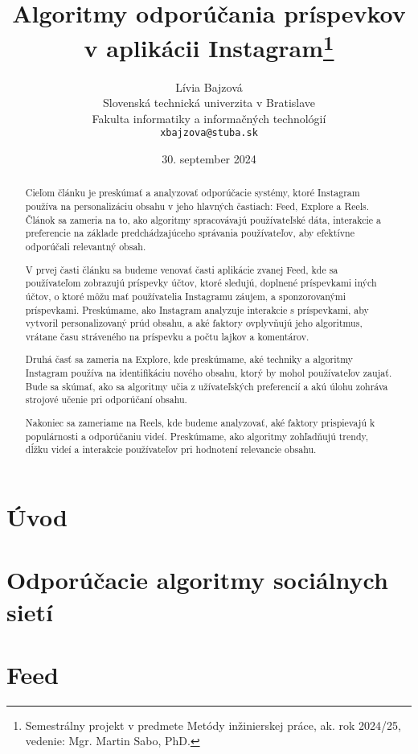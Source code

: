 \documentclass[10pt,twoside,slovak,a4paper]{article}
\title{Algoritmy odporúčania príspevkov v aplikácii Instagram\thanks{Semestrálny projekt v predmete Metódy inžinierskej práce, ak. rok 2024/25, vedenie: Mgr. Martin Sabo, PhD.}} %
\author{Lívia Bajzová\\[2pt]
	{\small Slovenská technická univerzita v Bratislave}\\
	{\small Fakulta informatiky a informačných technológií}\\
	{\small \texttt{xbajzova@stuba.sk}}
	}
\date{\small 30. september 2024} %
\begin{document}
\maketitle

\begin{abstract}
Cieľom článku je preskúmať a analyzovať odporúčacie systémy, ktoré Instagram používa na personalizáciu obsahu v jeho hlavných častiach: Feed, Explore a Reels. Článok sa zameria na to, ako algoritmy spracovávajú používateľské dáta, interakcie a preferencie na základe predchádzajúceho správania používateľov, aby efektívne odporúčali relevantný obsah.

V prvej časti článku sa budeme venovať časti aplikácie zvanej Feed, kde sa používateľom zobrazujú príspevky účtov, ktoré sledujú, doplnené príspevkami iných účtov, o ktoré môžu mať používatelia Instagramu záujem, a sponzorovanými príspevkami. Preskúmame, ako Instagram analyzuje interakcie s príspevkami, aby vytvoril personalizovaný prúd obsahu, a aké faktory ovplyvňujú jeho algoritmus, vrátane času stráveného na príspevku a počtu lajkov a komentárov.

Druhá časť sa zameria na Explore, kde preskúmame, aké techniky a algoritmy Instagram používa na identifikáciu nového obsahu, ktorý by mohol používateľov zaujať. Bude sa skúmať, ako sa algoritmy učia z užívateľských preferencií a akú úlohu zohráva strojové učenie pri odporúčaní obsahu.

Nakoniec sa zameriame na Reels, kde budeme analyzovať, aké faktory prispievajú k populárnosti a odporúčaniu videí. Preskúmame, ako algoritmy zohľadňujú trendy, dĺžku videí a interakcie používateľov pri hodnotení relevancie obsahu.

\end{abstract}



\section{Úvod}



\section{Odporúčacie algoritmy sociálnych sietí} \label{nejaka}


\section{Feed} \label{ina}
\end{document}
